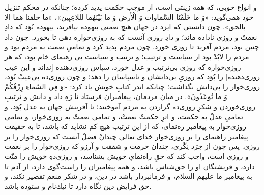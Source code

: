 و انواع خوبى، كه همه زينتى است، از موجب حكمت پديد كرده؛ چنانكه در محكم تنزيل خود همى‌گويد: «وَ ما خَلَقْنَا السَّماوات وَ الْأَرض وَ ما بَيْنَهُما لللاعِبِین»، «ما خلقنا هما الا بالحق». چون دانستى كه ايزد در جهان هيچ نعمتى بيهوده نيافريد، بيهوده بُوَد كه دادِ نعمتْ و روزى ناداده ماند؛ و دادِ روزى آنست كه به روزى‌خواره دهى تا بخورد. چون داد چنين بود، مردم آفريد تا روزى خورد. چون مردم پديد كرد و تمامیِ نعمت به مردم بود و مردم را لابُدْ بود از سياست و ترتيب؛ و ترتيب و سياست بى‌ رهنماى خام بود، كه هر روزى‌خواره كه روزى بى‌ترتيب و عدل خورد، سپاس روزى‌دهنده [نداند و اين عيب روزى‌دهنده] را بُوَد كه روزىِ بى‌دانشان و ناسپاسان را دهد؛ و چون روزى‌ده بى‌عيبْ بُوَد، روزى‌خوار را بى‌دانش نگذاشت؛ چنانكه اندر كتابِ خويش ياد كرد: «وَ فِي السّماءِ رِزْقُكُمْ وَ ما تُوعَدُونَ». در ميان مردمان، پيغامبران فرستاد تا رَهِ داد و دانش و ترتيبِ روزی‌خوردن و شكرِ روزى‌ده گزاردن  به مردم آموختند؛ تا آفرينش جهان به عدل بُوَد، و تمامیِ عدلْ به حكمت، و اثرِ حكمتْ نعمتْ، و تمامى نعمتْ به روزى‌خوار، و تمامى روزى‌خوار به پيغامبر ره‌نماى، كه از اين ترتيب هيچ كم نشايد كه باشد، تا به حقيقت پيغامبر راهنماى را بر روزى‌خوار خداى تعالى چندانْ فضلْ آنست كه روزى‌خوار را بر روزى. پس چون از خِرَد نِگَرى، چندان حرمت و شفقت و آرزو كه روزى‌خوار را بر نعمت و روزی است، واجب كند كه حقِ راه‌نماىِ خويش بشناسد، و روزى‌دهِ خويش را منّت دارد، و فريشتگان او را حق‌شناس باشد، و همه پيغامبران را راست‌گوى دارد، از آدم تا به پيغامبر ما عليهم السلام، و فرمانبردار باشد در دين، و در شكر منعم تقصير نكند، و حق فرايض دين نگاه دارد تا نيك‌نام و ستوده باشد.
\newpage